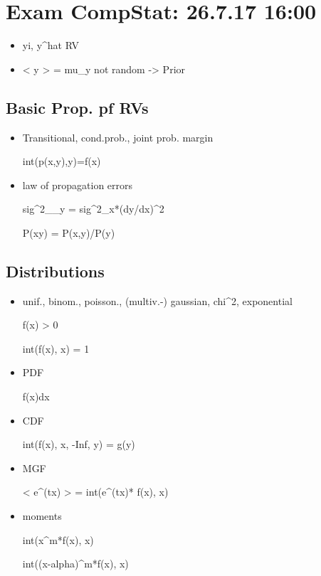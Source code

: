 \section{Exam CompStat: 26.7.17 16:00}\label{exam-compstat-26.7.17-1600}

\begin{itemize}
\tightlist
\item
  yi, y\^{}hat RV
\item
  \textless{} y \textgreater{} = mu\_y not random -\textgreater{} Prior
\end{itemize}

\subsection{Basic Prop. pf RVs}\label{basic-prop.-pf-rvs}

\begin{itemize}
\item
  Transitional, cond.prob., joint prob. margin

  int(p(x,y),y)=f(x)
\item
  law of propagation errors

  sig\^{}2\_\_y = sig\^{}2\_x*(dy/dx)\^{}2

  P(x\textbar{}y) = P(x,y)/P(y)
\end{itemize}

\subsection{Distributions}\label{distributions}

\begin{itemize}
\item
  unif., binom., poisson., (multiv.-) gaussian, chi\^{}2, exponential

  f(x) \textgreater{} 0

  int(f(x), x) = 1
\item
  PDF

  f(x)dx
\item
  CDF

  int(f(x), x, -Inf, y) = g(y)
\item
  MGF

  \textless{} e\^{}(tx) \textgreater{} = int(e\^{}(tx)* f(x), x)
\item
  moments

  int(x\^{}m*f(x), x)

  int((x-alpha)\^{}m*f(x), x)
\end{itemize}

